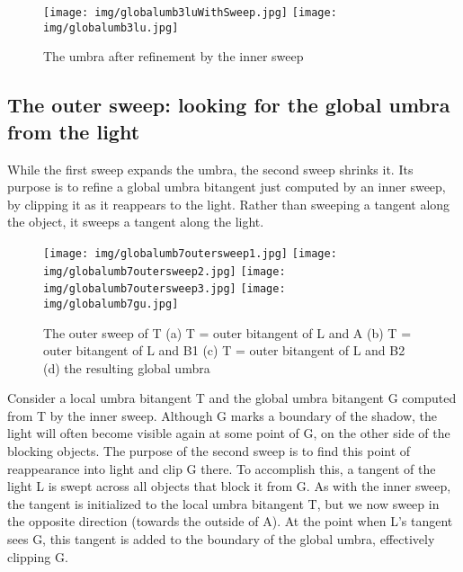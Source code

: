 \documentclass[9pt,twocolumn]{article}
\begin{document}
\begin{figure}
\begin{center}
\texttt{[image: img/globalumb3luWithSweep.jpg]}
\texttt{[image: img/globalumb3lu.jpg]}
\end{center}
\caption{The umbra after refinement by the inner sweep}
\label{fig:umbraafterinnersweep}
\end{figure}


\clearpage

\subsection{The outer sweep: looking for the global umbra from the light}
\label{sec:outersweep}

While the first sweep expands the umbra, the second sweep shrinks it.
Its purpose is to refine a global umbra bitangent just computed by an
inner sweep, by clipping it as it reappears to the light.
Rather than sweeping a tangent along the object,
it sweeps a tangent along the light.

\begin{figure}
\begin{center}
\texttt{[image: img/globalumb7outersweep1.jpg]}
\texttt{[image: img/globalumb7outersweep2.jpg]}
\texttt{[image: img/globalumb7outersweep3.jpg]}
\texttt{[image: img/globalumb7gu.jpg]}
\end{center}
\caption{The outer sweep of T (a) T = outer bitangent of L and A
	 (b) T = outer bitangent of L and B1
	 (c) T = outer bitangent of L and B2
	 (d) the resulting global umbra}
\label{fig:severalstages}
\end{figure}

Consider a local umbra bitangent T and the global umbra bitangent G
computed from T by the inner sweep.
Although G marks a boundary of the shadow,
the light will often become visible again at some point of G,
on the other side of the blocking objects.
The purpose of the second sweep is to find this point of reappearance
into light and clip G there.
To accomplish this, a tangent of the light L is swept across 
all objects that block it from G.
As with the inner sweep,
the tangent is initialized to the local umbra bitangent T, 
but we now sweep in the opposite direction (towards the outside of A).
At the point when L's tangent sees G, 
this tangent is added to the boundary of the global umbra, effectively clipping G.
\end{document}
